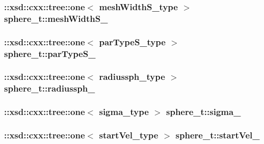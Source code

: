 \hypertarget{classsphere__t_a66cbf0de688f330019fca6841df8ff8d}{
\subsubsection[{mesh\-Width\-S\-\_\-}]{\setlength{\rightskip}{0pt plus 5cm}\-::xsd\-::cxx\-::tree\-::one$<$ {\bf mesh\-Width\-S\-\_\-type} $>$ sphere\-\_\-t\-::mesh\-Width\-S\-\_\-\hspace{0.3cm}{\ttfamily [protected]}}}\label{classsphere__t_a66cbf0de688f330019fca6841df8ff8d}
\hypertarget{classsphere__t_aad0691c4e88842ee6d7cbc9bdb747653}{
\subsubsection[{par\-Type\-S\-\_\-}]{\setlength{\rightskip}{0pt plus 5cm}\-::xsd\-::cxx\-::tree\-::one$<$ {\bf par\-Type\-S\-\_\-type} $>$ sphere\-\_\-t\-::par\-Type\-S\-\_\-\hspace{0.3cm}{\ttfamily [protected]}}}\label{classsphere__t_aad0691c4e88842ee6d7cbc9bdb747653}
\hypertarget{classsphere__t_a69b68e91265646581453df0608c78eb3}{
\subsubsection[{radiussph\-\_\-}]{\setlength{\rightskip}{0pt plus 5cm}\-::xsd\-::cxx\-::tree\-::one$<$ {\bf radiussph\-\_\-type} $>$ sphere\-\_\-t\-::radiussph\-\_\-\hspace{0.3cm}{\ttfamily [protected]}}}\label{classsphere__t_a69b68e91265646581453df0608c78eb3}
\hypertarget{classsphere__t_ab29451e11196d4689c16efd239a3b65d}{
\subsubsection[{sigma\-\_\-}]{\setlength{\rightskip}{0pt plus 5cm}\-::xsd\-::cxx\-::tree\-::one$<$ {\bf sigma\-\_\-type} $>$ sphere\-\_\-t\-::sigma\-\_\-\hspace{0.3cm}{\ttfamily [protected]}}}\label{classsphere__t_ab29451e11196d4689c16efd239a3b65d}
\hypertarget{classsphere__t_a891193e6c93432b62517c06b5c1f7872}{
\subsubsection[{start\-Vel\-\_\-}]{\setlength{\rightskip}{0pt plus 5cm}\-::xsd\-::cxx\-::tree\-::one$<$ {\bf start\-Vel\-\_\-type} $>$ sphere\-\_\-t\-::start\-Vel\-\_\-\hspace{0.3cm}{\ttfamily [protected]}}}\label{classsphere__t_a891193e6c93432b62517c06b5c1f7872}


